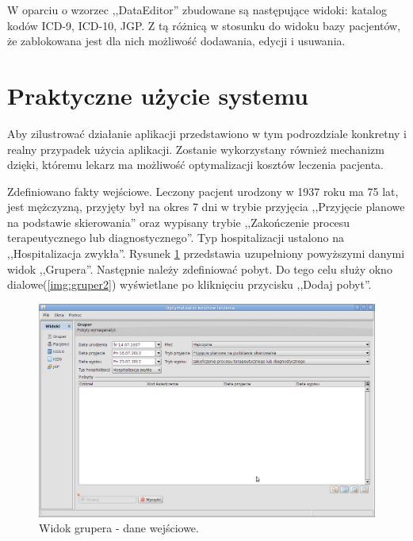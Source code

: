 W oparciu o wzorzec ,,DataEditor'' zbudowane są następujące widoki: katalog kodów ICD-9, ICD-10, JGP. Z tą różnicą w stosunku do widoku bazy pacjentów, że zablokowana jest dla nich możliwość dodawania, edycji i usuwania.


\section{Praktyczne użycie systemu}
\label{sec:praktyczneUzycieSystemu}
Aby zilustrować działanie aplikacji przedstawiono w tym podrozdziale konkretny i realny przypadek użycia aplikacji. Zostanie wykorzystany również mechanizm dzięki, któremu lekarz ma możliwość optymalizacji kosztów leczenia pacjenta.

Zdefiniowano fakty wejściowe. Leczony pacjent urodzony w 1937 roku ma 75 lat, jest mężczyzną, przyjęty był na okres 7 dni w trybie przyjęcia ,,Przyjęcie planowe na podstawie skierowania'' oraz wypisany trybie ,,Zakończenie procesu terapeutycznego lub diagnostycznego''. Typ hospitalizacji ustalono na ,,Hospitalizacja zwykła''. Rysunek \ref{img:gruper1} przedstawia uzupełniony powyższymi danymi widok ,,Grupera''. 
Następnie należy zdefiniować pobyt. Do tego celu służy okno dialowe(\ref{img:gruper2}) wyświetlane po kliknięciu przycisku ,,Dodaj pobyt''.

\begin{figure}%
\centering
\includegraphics[scale=0.4]{images/gruper1}
\caption[Widok grupera]{Widok grupera - dane wejściowe.}
\label{img:gruper1}
\end{figure}

